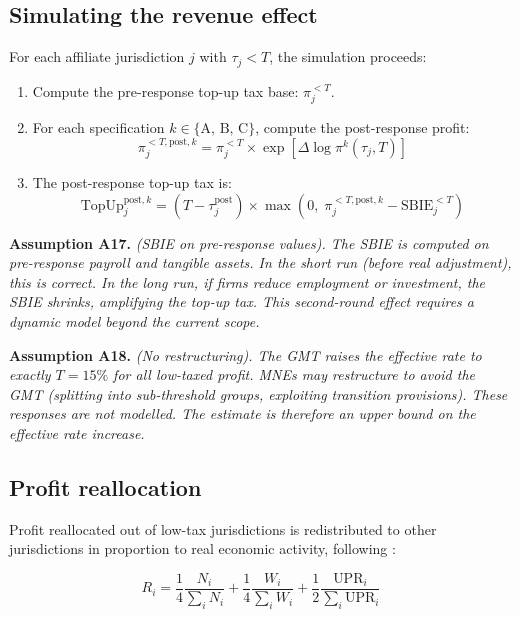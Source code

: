 \documentclass[11pt,a4paper]{article}
\newcommand{\assumption}[2]{\noindent\textbf{Assumption #1.} \textit{#2}\medskip}
\begin{document}
\subsection{Simulating the revenue effect}\label{sec:behav_sim}

For each affiliate jurisdiction $j$ with $\tau_j < T$, the simulation proceeds:

\begin{enumerate}
\item Compute the pre-response top-up tax base: $\pi_j^{<T}$.
\item For each specification $k \in \{\text{A, B, C}\}$, compute the post-response profit:
\begin{equation}\label{eq:post_response}
\pi_j^{<T,\text{post},k} = \pi_j^{<T} \times \exp\!\left[\Delta\log\pi^k(\tau_j, T)\right]
\end{equation}
\item The post-response top-up tax is:
\begin{equation}\label{eq:topup_post}
\text{TopUp}_j^{\text{post},k} = (T - \tau_j^{\text{post}}) \times \max\!\left(0,\; \pi_j^{<T,\text{post},k} - \text{SBIE}_j^{<T}\right)
\end{equation}
\end{enumerate}

\assumption{A17}{(SBIE on pre-response values). The SBIE is computed on pre-response payroll and tangible assets. In the short run (before real adjustment), this is correct. In the long run, if firms reduce employment or investment, the SBIE shrinks, amplifying the top-up tax. This second-round effect requires a dynamic model beyond the current scope.}

\assumption{A18}{(No restructuring). The GMT raises the effective rate to exactly $T = 15\%$ for all low-taxed profit. MNEs may restructure to avoid the GMT (splitting into sub-threshold groups, exploiting transition provisions). These responses are not modelled. The estimate is therefore an upper bound on the effective rate increase.}

\subsection{Profit reallocation}\label{sec:reallocation}

Profit reallocated out of low-tax jurisdictions is redistributed to other jurisdictions in proportion to real economic activity, following \citet{garcia2024}:

\begin{equation}\label{eq:reallocation}
R_i = \frac{1}{4}\frac{N_i}{\sum_i N_i} + \frac{1}{4}\frac{W_i}{\sum_i W_i} + \frac{1}{2}\frac{\text{UPR}_i}{\sum_i \text{UPR}_i}
\end{equation}
\end{document}
